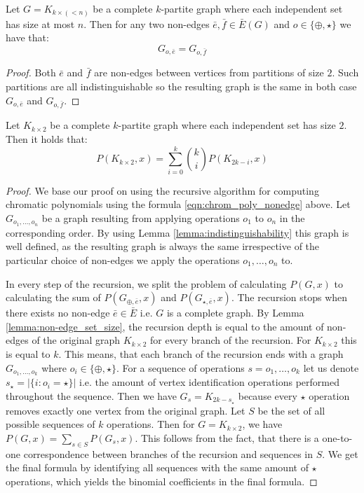 \begin{lemma}
\label{lemma:indistinguishability}
    Let $G = K_{k \times (<n)}$ be a complete $k$-partite graph where each independent set has size at most $n$. Then for any two non-edges $\bar{e},\bar{f} \in \bar{E}(G)$ and $o \in \{\oplus,\star\}$ we have that: 
    \[ G_{o,\bar{e}} = G_{o,\bar{f}}\]
\end{lemma}

\begin{proof}
    Both $\bar{e}$ and $\bar{f}$ are non-edges between vertices from partitions of size $2$. Such partitions are all indistinguishable so the resulting graph is the same in both case $G_{o,\bar{e}}$ and $G_{o,\bar{f}}$.
\end{proof}

\begin{claim}
    Let $K_{k \times 2}$ be a complete $k$-partite graph where each independent set has size $2$. Then it holds that: 
    \begin{equation}\label{eqn:chromatic-pascal}
        P(K_{k \times 2},x) = \sum_{i=0}^{k} \binom{k}{i} P(K_{2k-i},x)
    \end{equation}
\end{claim}

\begin{proof}
    We base our proof on using the recursive algorithm for computing chromatic polynomials using the formula \ref{eqn:chrom_poly_nonedge} above. Let $G_{o_1,\ldots,o_n}$ be a graph resulting from applying operations $o_1$ to $o_n$ in the corresponding order. By using Lemma \ref{lemma:indistinguishability} this graph is well defined, as the resulting graph is always the same irrespective of the particular choice of non-edges we apply the operations $o_1, \ldots,o_n$ to.

    In every step of the recursion, we split the problem of calculating $P(G,x)$ to calculating the sum of $P(G_{\oplus,\bar{e}},x)$ and $P(G_{\star,\bar{e}},x)$. The recursion stops when there exists no non-edge $\bar{e} \in \bar{E}$ i.e. $G$ is a complete graph. By Lemma \ref{lemma:non-edge_set_size}, the recursion depth is equal to the amount of non-edges of the original graph $K_{k\times 2}$ for every branch of the recursion. For $K_{k\times 2}$ this is equal to $k$. This means, that each branch of the recursion ends with a graph $G_{o_1,\ldots,o_k}$ where $o_i \in \{\oplus,\star\}$. For a sequence of operations $s=o_1,\ldots,o_k$ let us denote $s_{\star} = |\{ i : o_i   =\star\}|$ i.e. the amount of vertex identification operations performed throughout the sequence. Then we have $G_s = K_{2k-s_{\star}}$ because every $\star$ operation removes exactly one vertex from the original graph. Let $S$ be the set of all possible sequences of $k$ operations. Then for $G=K_{k\times 2}$, we have $P(G,x)= \sum_{s\in S}P(G_s,x)$. This follows from the fact, that there is a one-to-one correspondence between branches of the recursion and sequences in $S$. We get the final formula by identifying all sequences with the same amount of $\star$ operations, which yields the binomial coefficients in the final formula. 
\end{proof}


